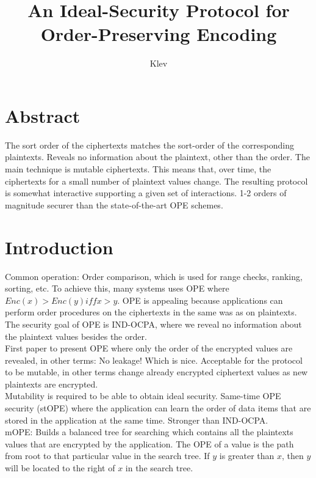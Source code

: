 \documentclass[10pt]{article}
\begin{document}
\author{Klev}
\title{An Ideal-Security Protocol for Order-Preserving Encoding}
\maketitle

\section{Abstract}

The sort order of the ciphertexts matches the sort-order of the corresponding plaintexts. Reveals no information about the plaintext, other than the order. The main technique is mutable ciphertexts. This means that, over time, the ciphertexts for a small number of plaintext values change. The resulting protocol is somewhat interactive supporting a given set of interactions. 1-2 orders of magnitude securer than the state-of-the-art OPE schemes. 

\section{Introduction}

Common operation: Order comparison, which is used for range checks, ranking, sorting, etc. To achieve this, many systems uses OPE where $Enc(x) > Enc(y) iff x > y$. OPE is appealing because applications can perform order procedures on the ciphertexts in the same was as on plaintexts. The security goal of OPE is IND-OCPA, where we reveal no information about the plaintext values besides the order.\\

First paper to present OPE where only the order of the encrypted values are revealed, in other terms: No leakage! Which is nice. Acceptable for the protocol to be mutable, in other terms change already encrypted ciphertext values as new plaintexts are encrypted.\\

Mutability is required to be able to obtain ideal security. Same-time OPE security (stOPE) where the application can learn the order of data items that are stored in the application at the same time. Stronger than IND-OCPA.\\

mOPE: Builds a balanced tree for searching which contains all the plaintexts values that are encrypted by the application. The OPE of a value is the path from root to that particular value in the search tree.  If $y$ is greater than $x$, then $y$ will be located to the right of $x$ in the search tree.\\
\end{document}
